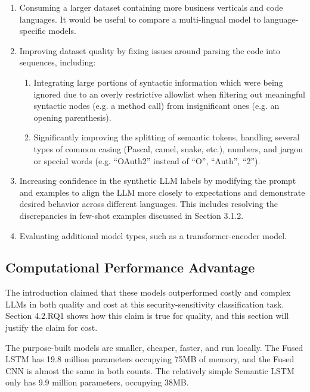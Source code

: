 \documentclass[11pt]{article}
\begin{document}
\begin{enumerate}
\def\labelenumi{\arabic{enumi}.}
\item
  Consuming a larger dataset containing more business verticals and code languages.
  It would be useful to compare a multi-lingual model to language-specific models.
\item
  Improving dataset quality by fixing issues around parsing the code into
  sequences, including:

  \begin{enumerate}
  \def\labelenumii{\alph{enumii}.}
  \item
    Integrating large portions of syntactic information which were being
    ignored due to an overly restrictive allowlist when filtering
    out meaningful syntactic nodes (e.g. a method call) from
    insignificant ones (e.g. an opening parenthesis).
  \item
    Significantly improving the splitting of semantic tokens,
    handling several types of common casing (Pascal, camel, snake,
    etc.), numbers, and jargon or special words (e.g. ``OAuth2'' instead
    of ``O'', ``Auth'', ``2'').
  \end{enumerate}
\item
  Increasing confidence in the synthetic LLM labels by
  modifying the prompt and examples to align the LLM more closely to expectations
  and demonstrate desired behavior across different languages. This includes 
  resolving the discrepancies in few-shot examples discussed in Section 3.1.2.
\item
  Evaluating additional model types, such as a
  transformer-encoder model.
\end{enumerate}

\subsection{Computational Performance Advantage}\label{computational-performance-advantage}

The introduction claimed that these models outperformed costly and
complex LLMs in both quality and cost at this security-sensitivity
classification task. Section 4.2.RQ1 shows how this claim is true for
quality, and this section will justify the claim for cost.

The purpose-built models are smaller, cheaper, faster, and run locally.
The Fused LSTM has 19.8 million parameters occupying 75MB of memory, and
the Fused CNN is almost the same in both counts. The relatively simple
Semantic LSTM only has 9.9 million parameters, occupying 38MB.
\end{document}

